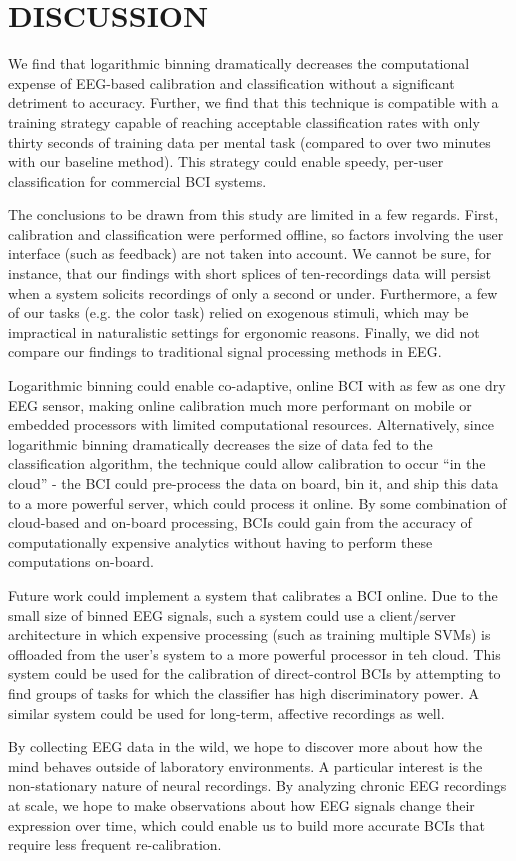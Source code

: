 \section{\uppercase{Discussion}}

\noindent We find that logarithmic binning dramatically decreases the computational expense of EEG-based calibration and classification without a significant detriment to accuracy. Further, we find that this technique is compatible with a training strategy capable of reaching acceptable classification rates with only thirty seconds of training data per mental task (compared to over two minutes with our baseline method). This strategy could enable speedy, per-user classification for commercial BCI systems.

The conclusions to be drawn from this study are limited in a few regards. First, calibration and classification were performed offline, so factors involving the user interface (such as feedback) are not taken into account. We cannot be sure, for instance, that our findings with short splices of ten-recordings data will persist when a system solicits recordings of only a second or under. Furthermore, a few of our tasks (e.g. the color task) relied on exogenous stimuli, which may be impractical in naturalistic settings for ergonomic reasons. Finally, we did not compare our findings to traditional signal processing methods in EEG.

Logarithmic binning could enable co-adaptive, online BCI with as few as one dry EEG sensor, making online calibration much more performant on mobile or embedded processors with limited computational resources. Alternatively, since logarithmic binning dramatically decreases the size of data fed to the classification algorithm, the technique could allow calibration to occur “in the cloud” - the BCI could pre-process the data on board, bin it, and ship this data to a more powerful server, which could process it online. By some combination of cloud-based and on-board processing, BCIs could gain from the accuracy of computationally expensive analytics without having to perform these computations on-board.

Future work could implement a system that calibrates a BCI online. Due to the small size of binned EEG signals, such a system could use a client/server architecture in which expensive processing (such as training multiple SVMs) is offloaded from the user’s system to a more powerful processor in teh cloud. This system could be used for the calibration of direct-control BCIs by attempting to find groups of tasks for which the classifier has high discriminatory power. A similar system could be used for long-term, affective recordings as well.

By collecting EEG data in the wild, we hope to discover more about how the mind behaves outside of laboratory environments. A particular interest is the non-stationary nature of neural recordings. By analyzing chronic EEG recordings at scale, we hope to make observations about how EEG signals change their expression over time, which could enable us to build more accurate BCIs that require less frequent re-calibration.